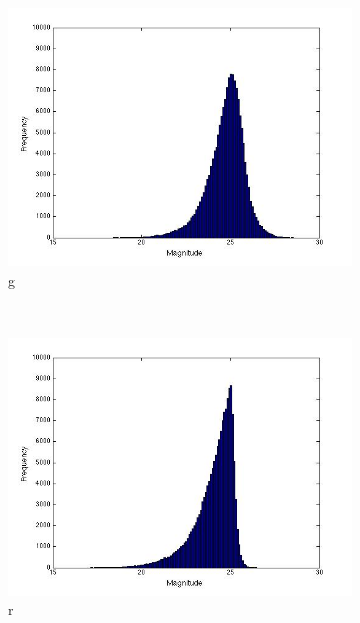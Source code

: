\documentclass[useAMS,usenatbib,fleqn]{mn2e}
\begin{document}
\begin{figure}
        \centering
        \begin{subfigure}[b]{0.2\textwidth}
                \includegraphics[trim = 35px 15px 50px 25px, clip=true,width=\textwidth]{g.jpg}
                \caption{g}
        \end{subfigure}
        ~
        \begin{subfigure}[b]{0.2\textwidth}
                \includegraphics[trim = 35px 15px 50px 25px, clip=true,width=\textwidth]{r.jpg}
                \caption{r}
        \end{subfigure}
         ~
        \begin{subfigure}[b]{0.2\textwidth}

\end{subfigure}
\end{figure}
\end{document}
